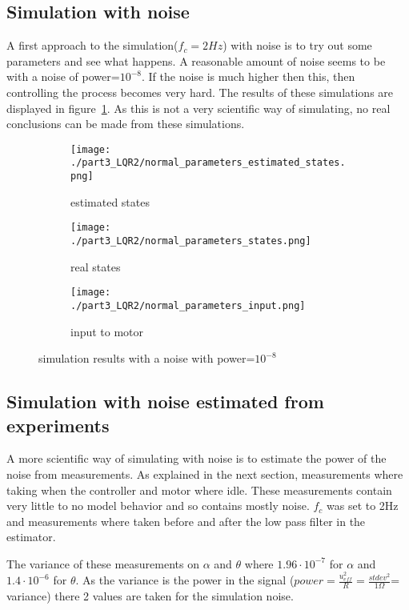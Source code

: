 \subsection{Simulation with noise}
	A first approach to the simulation($f_c=2Hz$) with noise is to try out some parameters and see what happens. A reasonable amount of noise seems to be with a noise of power=$10^{-8}$. If the noise is much higher then this, then controlling the process becomes very hard. The results of these simulations are displayed in figure~\ref{fig:simulation results noise}. As this is not a very scientific way of simulating, no real conclusions can be made from these simulations.
	\begin{figure}[H]
		\centering
		\begin{subfigure}[b]{0.45\textwidth}
			\texttt{[image: ./part3\_LQR2/normal\_parameters\_estimated\_states.png]}
			\caption{estimated states}
		\end{subfigure}
		\begin{subfigure}[b]{0.45\textwidth}
			\texttt{[image: ./part3\_LQR2/normal\_parameters\_states.png]}
			\caption{real states}
		\end{subfigure}
		\begin{subfigure}[b]{0.45\textwidth}
			\texttt{[image: ./part3\_LQR2/normal\_parameters\_input.png]}
			\caption{input to motor}
		\end{subfigure}
		\caption{simulation results with a noise with power=$10^{-8}$}
		\label{fig:simulation results noise}
	\end{figure}
\subsection{Simulation with noise estimated from experiments}
	A more scientific way of simulating with noise is to estimate the power of the noise from measurements. As explained in the next section, measurements where taking when the controller and motor where idle. These measurements contain very little to no model behavior and so contains mostly noise. $f_c$ was set to 2Hz and measurements where taken before and after the low pass filter in the estimator. 
	
	The variance of these measurements on $\alpha$ and $\theta$ where $1.96 \cdot 10^{-7}$ for $\alpha$ and $1.4 \cdot 10^{-6}$ for $\theta$. As the variance is the power in the signal ($power = \frac{u_{eff}^2}{R} = \frac{stdev^2}{1 \Omega}$= variance) there 2 values are taken for the simulation noise.
	
